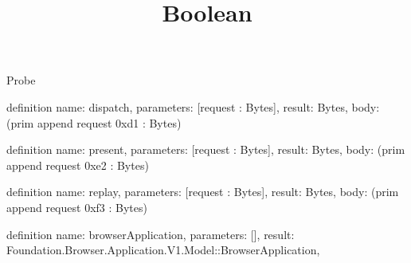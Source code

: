 \begin{lexlean}{Probe}
\title{Boolean}
\begin{semanticmodule}
definition{
  name: dispatch,
  parameters: [request : Bytes],
  result: Bytes,
  body: (prim append request 0xd1 : Bytes)
}

definition{
  name: present,
  parameters: [request : Bytes],
  result: Bytes,
  body: (prim append request 0xe2 : Bytes)
}

definition{
  name: replay,
  parameters: [request : Bytes],
  result: Bytes,
  body: (prim append request 0xf3 : Bytes)
}

definition{
  name: browserApplication,
  parameters: [],
  result: Foundation.Browser.Application.V1.Model::BrowserApplication,
}
\end{semanticmodule}
\end{lexlean}
